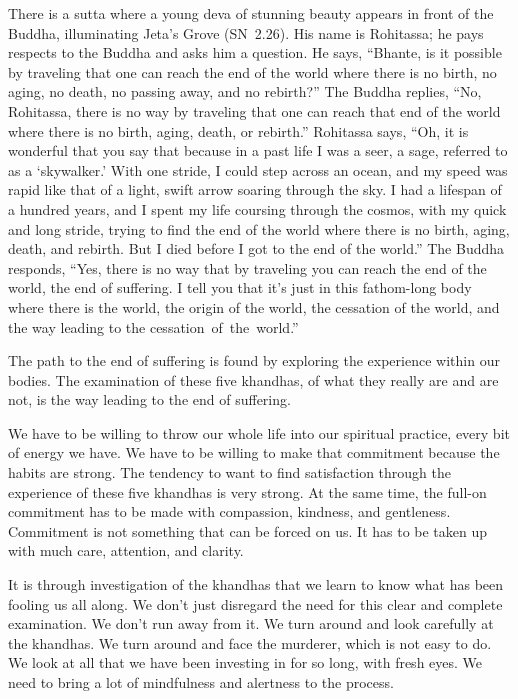 There is a sutta where a young deva of stunning beauty appears in front of the Buddha, illuminating Jeta's Grove \mbox{(SN 2.26)}. His name is Rohitassa; he pays respects to the Buddha and asks him a question. He says, ``Bhante, is it possible by traveling that one can reach the end of the world where there is no birth, no aging, no death, no passing away, and no rebirth?'' The Buddha replies, ``No, Rohitassa, there is no way by traveling that one can reach that end of the world where there is no birth, aging, death, or rebirth.'' Rohitassa says, ``Oh, it is wonderful that you say that because in a past life I was a seer, a sage, referred to as a `skywalker.' With one stride, I could step across an ocean, and my speed was rapid like that of a light, swift arrow soaring through the sky. I had a lifespan of a hundred years, and I spent my life coursing through the cosmos, with my quick and long stride, trying to find the end of the world where there is no birth, aging, death, and rebirth. But I died before I got to the end of the world.'' The Buddha responds, ``Yes, there is no way that by traveling you can reach the end of the world, the end of suffering. I tell you that it's just in this fathom-long body where there is the world, the origin of the world, the cessation of the world, and the way leading to the \mbox{cessation of the world.''}

The path to the end of suffering is found by exploring the experience within our bodies. The examination of these five khandhas, of what they really are and are not, is the way leading to the end of suffering.

\enlargethispage{1\baselineskip}
We have to be willing to throw our whole life into our spiritual practice, every bit of energy we have. We have to be willing to make that commitment because the habits are strong. The tendency to want to find satisfaction through the experience of these five khandhas is very strong. At the same time, the full-on commitment has to be made with compassion, kindness, and gentleness. Commitment is not something that can be forced on us. It has to be taken up with much care, attention, and clarity.

It is through investigation of the khandhas that we learn to know what has been fooling us all along. We don't just disregard the need for this clear and complete examination. We don't run away from it. We turn around and look carefully at the khandhas. We turn around and face the murderer, which is not easy to do. We look at all that we have been investing in for so long, with fresh eyes. We need to bring a lot of mindfulness and alertness to the process.

